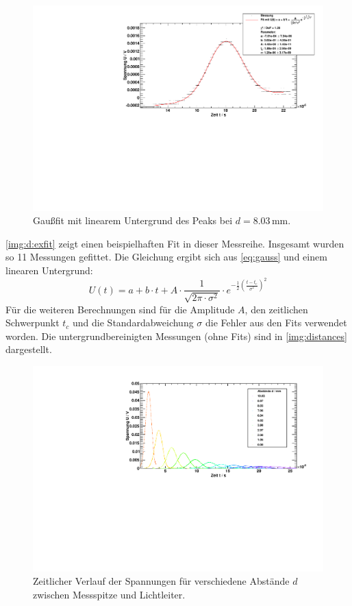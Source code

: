 \begin{figure}[H]
\begin{center}
  \includegraphics[width=\textwidth]{../img/part2/dist02.pdf}
  \caption{Gaußfit mit linearem Untergrund des Peaks bei $d=8.03$\,mm.}
  \label{img:d:exfit}
\end{center}
\end{figure}
\autoref{img:d:exfit} zeigt einen beispielhaften Fit in dieser Messreihe. Insgesamt wurden so 11 Messungen gefittet. Die Gleichung ergibt sich 
aus \autoref{eq:gauss} und einem linearen Untergrund:
\begin{equation}
  U(t) = a + b \cdot t + A \cdot \frac{1}{\sqrt{2  \pi  \cdot \sigma^2}} \cdot
  e^{-\frac{1}{2} \left( \frac{t - t_{\text{c}}}{\sigma^2} \right)^2}
\end{equation}
Für die weiteren Berechnungen sind für die Amplitude $A$, den zeitlichen Schwerpunkt $t_c$ und die Standardabweichung $\sigma$ die Fehler aus 
den Fits verwendet worden.
Die untergrundbereinigten Messungen (ohne Fits) sind in \autoref{img:distances} dargestellt.
\begin{figure}[H]
\begin{center}
  \includegraphics[width=\textwidth]{../img/part2/distances.pdf}
  \caption{Zeitlicher Verlauf der Spannungen für verschiedene Abstände $d$ zwischen Messspitze und Lichtleiter.}
  \label{img:distances}
\end{center}
\end{figure}

